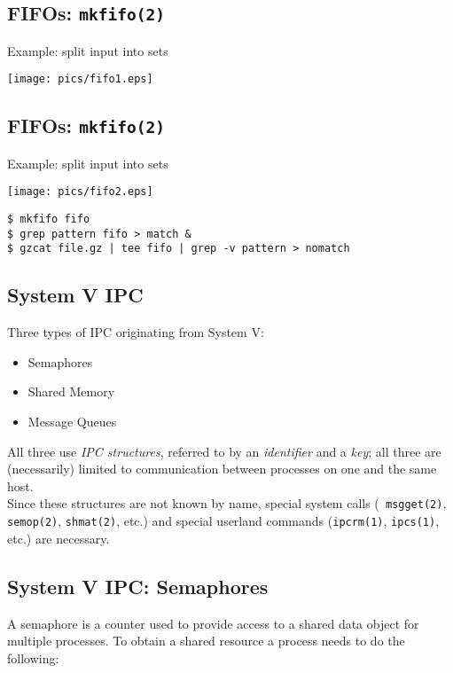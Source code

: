 \documentclass[xga]{xdvislides}
\begin{document}
\subsection{FIFOs: {\tt mkfifo(2)}}
Example: split input into sets
\begin{center}
	\texttt{[image: pics/fifo1.eps]}
\end{center}

\subsection{FIFOs: {\tt mkfifo(2)}}
Example: split input into sets
\begin{center}
	\texttt{[image: pics/fifo2.eps]}
\end{center}
\begin{verbatim}
$ mkfifo fifo
$ grep pattern fifo > match &
$ gzcat file.gz | tee fifo | grep -v pattern > nomatch
\end{verbatim}
\vfill

\subsection{System V IPC}
Three types of IPC originating from System V:
\begin{itemize}
	\item Semaphores
	\item Shared Memory
	\item Message Queues
\end{itemize}
\vspace{.5in}

All three use {\em IPC structures}, referred to by an {\em identifier} and a
{\em key}; all three are (necessarily) limited to communication between
processes on one and the same host.
\\

Since these structures are not known by name, special system calls ({\tt
msgget(2)}, {\tt semop(2)}, {\tt shmat(2)}, etc.) and special userland
commands ({\tt ipcrm(1)}, {\tt ipcs(1)}, etc.) are necessary.


\subsection{System V IPC: Semaphores}
A semaphore is a counter used to provide access to a shared data object for
multiple processes.  To obtain a shared resource a process needs to do the
following: \\
\end{document}
